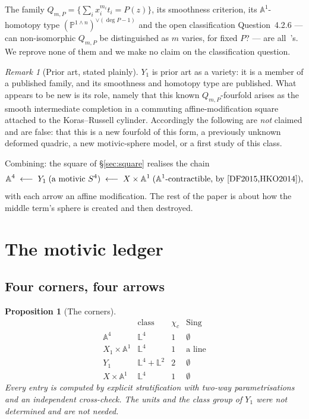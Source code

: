 \documentclass[11pt]{article}
\newtheorem{proposition}[theorem]{Proposition}
\theoremstyle{definition}
\theoremstyle{remark}
\newtheorem{remark}[theorem]{Remark}
\newcommand{\Aff}[1]{\mathbb{A}^{#1}}
\newcommand{\Lef}{\mathbb{L}}
\newcommand{\PP}{\mathbb{P}}
\newcommand{\Sing}{\operatorname{Sing}}
\newcommand{\chic}{\chi_c}
\begin{document}
The family $Q_{m,P}=\{\sum_i x_i^{m_i}t_i=P(z)\}$, its smoothness criterion,
its $\Aff{1}$-homotopy type $(\PP^{1\wedge n})^{\vee(\deg P-1)}$ and the open
classification Question~4.2.6 --- can non-isomorphic $Q_{m,P}$ be
distinguished as $m$ varies, for fixed $P$? --- are all~\cite{ADO2021}'s. We
reprove none of them and we make no claim on the classification question.

\begin{remark}[Prior art, stated plainly]\label{rem:priorart}
$Y_1$ is prior art as a variety: it is a member of a published family, and its
smoothness and homotopy type are published. What appears to be new is its
role, namely that this known $Q_{m,P}$-fourfold arises as the smooth
intermediate completion in a commuting affine-modification square attached to
the Koras--Russell cylinder. Accordingly the following are \emph{not} claimed
and are false: that this is a new fourfold of this form, a previously unknown
deformed quadric, a new motivic-sphere model, or a first study of this class.
\end{remark}

Combining: the square of \S\ref{sec:square} realises the chain
\begin{equation}\label{eq:chain}
\Aff{4}\;\longleftarrow\;Y_1\;(\text{a motivic }S^4)\;\longleftarrow\;
X\times\Aff{1}\;(\Aff{1}\text{-contractible, by \cite{DF2015,HKO2014}}),
\end{equation}
with each arrow an affine modification. The rest of the paper is about how the
middle term's sphere is created and then destroyed.

\section{The motivic ledger}\label{sec:ledger}

\subsection{Four corners, four arrows}

\begin{proposition}[The corners]\label{prop:corners}
\[
\begin{array}{l|ccc}
 & \text{class} & \chic & \Sing\\\hline
\Aff{4} & \Lef^4 & 1 & \emptyset\\
X_1\times\Aff{1} & \Lef^4 & 1 & \text{a line}\\
Y_1 & \Lef^4+\Lef^2 & 2 & \emptyset\\
X\times\Aff{1} & \Lef^4 & 1 & \emptyset
\end{array}
\]
Every entry is computed by explicit stratification with two-way
parametrisations and an independent cross-check. The units and the class group
of $Y_1$ were not determined and are not needed.
\end{proposition}
\end{document}
